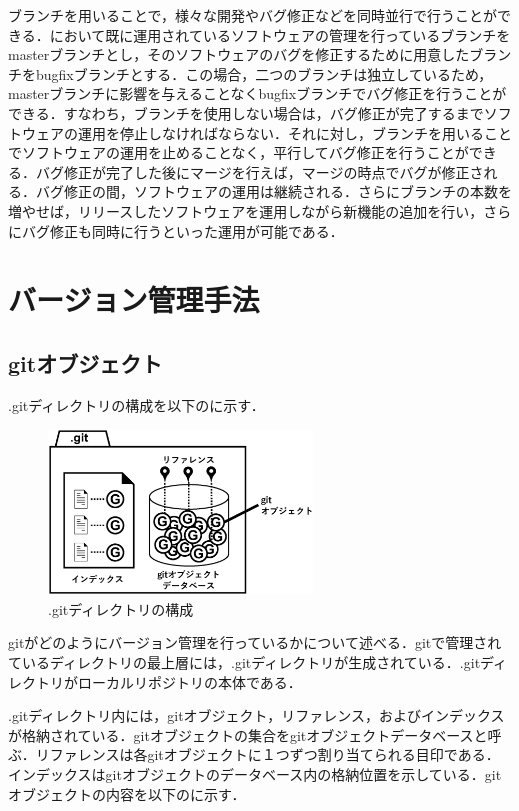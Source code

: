\documentclass[a4j,9pt,twocolumn]{jsarticle}
\begin{document}
ブランチを用いることで，様々な開発やバグ修正などを同時並行で行うことができる．において既に運用されているソフトウェアの管理を行っているブランチをmasterブランチとし，そのソフトウェアのバグを修正するために用意したブランチをbugfixブランチとする．この場合，二つのブランチは独立しているため，masterブランチに影響を与えることなくbugfixブランチでバグ修正を行うことができる．すなわち，ブランチを使用しない場合は，バグ修正が完了するまでソフトウェアの運用を停止しなければならない．それに対し，ブランチを用いることでソフトウェアの運用を止めることなく，平行してバグ修正を行うことができる．バグ修正が完了した後にマージを行えば，マージの時点でバグが修正される．バグ修正の間，ソフトウェアの運用は継続される．さらにブランチの本数を増やせば，リリースしたソフトウェアを運用しながら新機能の追加を行い，さらにバグ修正も同時に行うといった運用が可能である．

\section{バージョン管理手法}
\subsection{gitオブジェクト}
.gitディレクトリの構成を以下のに示す．

\begin{figure}[h]
\centering
\includegraphics[width=70mm]{img/git_obj.eps}
\caption{.gitディレクトリの構成}
\label{object1}
\end{figure}

gitがどのようにバージョン管理を行っているかについて述べる\cite{mecha}．gitで管理されているディレクトリの最上層には，.gitディレクトリが生成されている．.gitディレクトリがローカルリポジトリの本体である．

.gitディレクトリ内には，gitオブジェクト，リファレンス，およびインデックスが格納されている．gitオブジェクトの集合をgitオブジェクトデータベースと呼ぶ．リファレンスは各gitオブジェクトに１つずつ割り当てられる目印である．インデックスはgitオブジェクトのデータベース内の格納位置を示している．gitオブジェクトの内容を以下のに示す．
\end{document}
